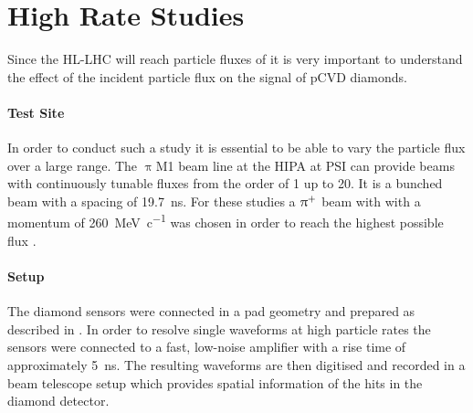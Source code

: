 \section{High Rate Studies}
Since the \ac{HL-LHC} will reach particle fluxes of  it is very important to understand the effect of the incident particle flux on the signal of \ac{pCVD} diamonds.
\paragraph{Test Site}
In order to conduct such a study it is essential to be able to vary the particle flux over a large range. The $\uppi$M1 beam line at the \ac{HIPA} at \ac{PSI} \cite{hipa} can provide beams with continuously tunable fluxes from the order of \SI{1}{\khzcm} up to \SI{20}{\mhzcm}. It is a bunched beam with a spacing of \SI{19.7}{\nano\second}. For these studies a $\uppi^{\text{+}}$ beam with with a momentum of \SI{260}{\mega\electronvolt\per c}  was chosen in order to reach the highest possible flux \cite{pim1}.\par
\paragraph{Setup}
The diamond sensors were connected in a pad geometry and prepared as described in \cite{rainer}. 
In order to resolve single waveforms at high particle rates the sensors were connected to a fast, low-noise amplifier with a rise time of approximately \SI{5}{\nano\second}. The resulting waveforms are then digitised and recorded in a beam telescope setup which provides spatial information of the hits in the diamond detector.\par
